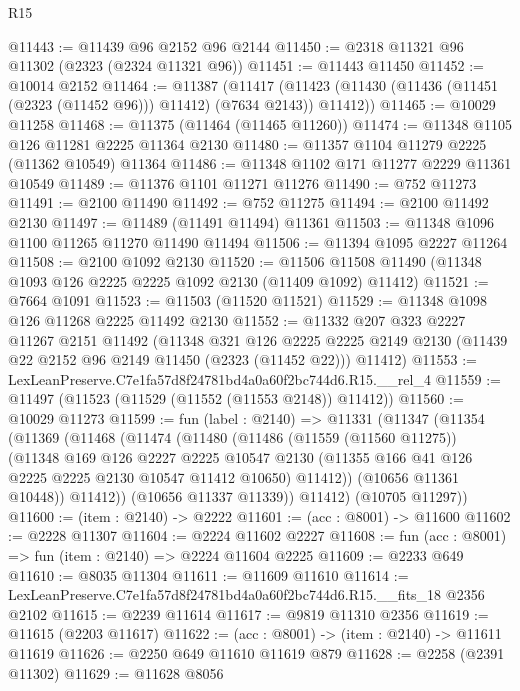 \begin{lexlean}{R15}
\begin{coremodule}
@11443 := @11439 @96 @2152 @96 @2144
@11450 := @2318 @11321 @96 @11302 (@2323 (@2324 @11321 @96))
@11451 := @11443 @11450
@11452 := @10014 @2152
@11464 := @11387
    (@11417 (@11423 (@11430 (@11436 (@11451 (@2323 (@11452 @96))) @11412) (@7634 @2143)) @11412))
@11465 := @10029 @11258
@11468 := @11375 (@11464 (@11465 @11260))
@11474 := @11348 @1105 @126 @11281 @2225 @11364 @2130
@11480 := @11357 @1104 @11279 @2225 (@11362 @10549) @11364
@11486 := @11348 @1102 @171 @11277 @2229 @11361 @10549
@11489 := @11376 @1101 @11271 @11276
@11490 := @752 @11273
@11491 := @2100 @11490
@11492 := @752 @11275
@11494 := @2100 @11492 @2130
@11497 := @11489 (@11491 @11494) @11361
@11503 := @11348 @1096 @1100 @11265 @11270 @11490 @11494
@11506 := @11394 @1095 @2227 @11264
@11508 := @2100 @1092 @2130
@11520 := @11506 @11508 @11490 (@11348 @1093 @126 @2225 @2225 @1092 @2130 (@11409 @1092) @11412)
@11521 := @7664 @1091
@11523 := @11503 (@11520 @11521)
@11529 := @11348 @1098 @126 @11268 @2225 @11492 @2130
@11552 := @11332
    @207
    @323
    @2227
    @11267
    @2151
    @11492
    (@11348
      @321
      @126
      @2225
      @2225
      @2149
      @2130
      (@11439 @22 @2152 @96 @2149 @11450 (@2323 (@11452 @22)))
      @11412)
@11553 := LexLeanPreserve.C7e1fa57d8f24781bd4a0a60f2bc744d6.R15.__rel_4
@11559 := @11497 (@11523 (@11529 (@11552 (@11553 @2148)) @11412))
@11560 := @10029 @11273
@11599 := fun (label : @2140) =>
  @11331
    (@11347
      (@11354
        (@11369
          (@11468
            (@11474
              (@11480
                (@11486
                  (@11559 (@11560 @11275))
                  (@11348
                    @169
                    @126
                    @2227
                    @2225
                    @10547
                    @2130
                    (@11355 @166 @41 @126 @2225 @2225 @2130 @10547 @11412 @10650)
                    @11412))
                (@10656 @11361 @10448))
              @11412))
          (@10656 @11337 @11339))
        @11412)
      (@10705 @11297))
@11600 := (item : @2140) -> @2222
@11601 := (acc : @8001) -> @11600
@11602 := @2228 @11307
@11604 := @2224 @11602 @2227
@11608 := fun (acc : @8001) => fun (item : @2140) => @2224 @11604 @2225
@11609 := @2233 @649
@11610 := @8035 @11304
@11611 := @11609 @11610
@11614 := LexLeanPreserve.C7e1fa57d8f24781bd4a0a60f2bc744d6.R15.__fits_18 @2356 @2102
@11615 := @2239 @11614
@11617 := @9819 @11310 @2356
@11619 := @11615 (@2203 @11617)
@11622 := (acc : @8001) -> (item : @2140) -> @11611 @11619
@11626 := @2250 @649 @11610 @11619 @879
@11628 := @2258 (@2391 @11302)
@11629 := @11628 @8056

\end{coremodule}
\end{lexlean}

